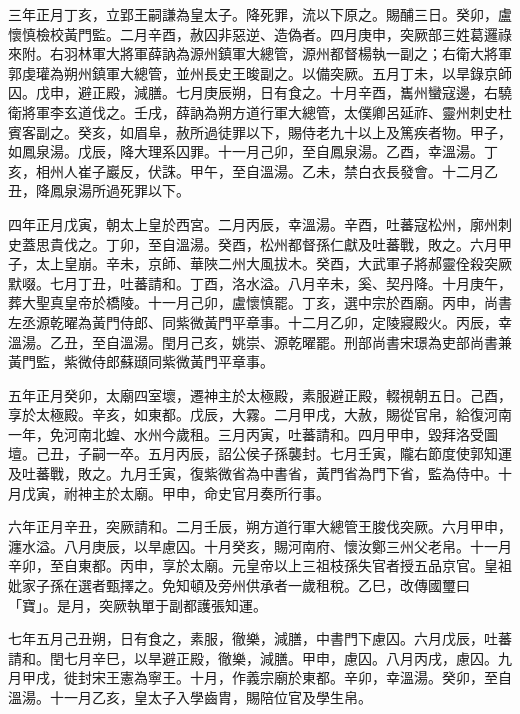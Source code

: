 \begin{pinyinscope}
 三年正月丁亥，立郢王嗣謙為皇太子。降死罪，流以下原之。賜酺三日。癸卯，盧懷慎檢校黃門監。二月辛酉，赦囚非惡逆、造偽者。四月庚申，突厥部三姓葛邏祿來附。右羽林軍大將軍薛訥為源州鎮軍大總管，源州都督楊執一副之；右衛大將軍郭虔瓘為朔州鎮軍大總管，並州長史王晙副之。以備突厥。五月丁未，以旱錄京師囚。戊申，避正殿，減膳。七月庚辰朔，日有食之。十月辛酉，巂州蠻寇邊，右驍衛將軍李玄道伐之。壬戌，薛訥為朔方道行軍大總管，太僕卿呂延祚、靈州刺史杜賓客副之。癸亥，如眉阜，赦所過徒罪以下，賜侍老九十以上及篤疾者物。甲子，如鳳泉湯。戊辰，降大理系囚罪。十一月己卯，至自鳳泉湯。乙酉，幸溫湯。丁亥，相州人崔子巖反，伏誅。甲午，至自溫湯。乙未，禁白衣長發會。十二月乙丑，降鳳泉湯所過死罪以下。



 四年正月戊寅，朝太上皇於西宮。二月丙辰，幸溫湯。辛酉，吐蕃寇松州，廓州刺史蓋思貴伐之。丁卯，至自溫湯。癸酉，松州都督孫仁獻及吐蕃戰，敗之。六月甲子，太上皇崩。辛未，京師、華陜二州大風拔木。癸酉，大武軍子將郝靈佺殺突厥默啜。七月丁丑，吐蕃請和。丁酉，洛水溢。八月辛未，奚、契丹降。十月庚午，葬大聖真皇帝於橋陵。十一月己卯，盧懷慎罷。丁亥，選中宗於酉廟。丙申，尚書左丞源乾曜為黃門侍郎、同紫微黃門平章事。十二月乙卯，定陵寢殿火。丙辰，幸溫湯。乙丑，至自溫湯。閏月己亥，姚崇、源乾曜罷。刑部尚書宋璟為吏部尚書兼黃門監，紫微侍郎蘇頲同紫微黃門平章事。



 五年正月癸卯，太廟四室壞，遷神主於太極殿，素服避正殿，輟視朝五日。己酉，享於太極殿。辛亥，如東都。戊辰，大霧。二月甲戌，大赦，賜從官帛，給復河南一年，免河南北蝗、水州今歲租。三月丙寅，吐蕃請和。四月甲申，毀拜洛受圖壇。己丑，子嗣一卒。五月丙辰，詔公侯子孫襲封。七月壬寅，隴右節度使郭知運及吐蕃戰，敗之。九月壬寅，復紫微省為中書省，黃門省為門下省，監為侍中。十月戊寅，祔神主於太廟。甲申，命史官月奏所行事。



 六年正月辛丑，突厥請和。二月壬辰，朔方道行軍大總管王脧伐突厥。六月甲申，瀍水溢。八月庚辰，以旱慮囚。十月癸亥，賜河南府、懷汝鄭三州父老帛。十一月辛卯，至自東都。丙申，享於太廟。元皇帝以上三祖枝孫失官者授五品京官。皇祖妣家子孫在選者甄擇之。免知頓及旁州供承者一歲租稅。乙巳，改傳國璽曰「寶」。是月，突厥執單于副都護張知運。



 七年五月己丑朔，日有食之，素服，徹樂，減膳，中書門下慮囚。六月戊辰，吐蕃請和。閏七月辛巳，以旱避正殿，徹樂，減膳。甲申，慮囚。八月丙戌，慮囚。九月甲戌，徙封宋王憲為寧王。十月，作義宗廟於東都。辛卯，幸溫湯。癸卯，至自溫湯。十一月乙亥，皇太子入學齒胄，賜陪位官及學生帛。




\end{pinyinscope}
